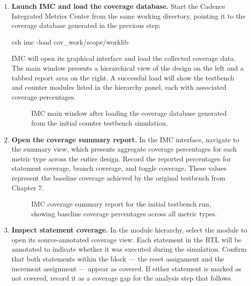 \begin{enumerate}
\item \textbf{Launch IMC and load the coverage database.} Start the Cadence Integrated Metrics Center from the same working directory, pointing it to the coverage database generated in the previous step:

\begin{codeblock}{csh}
imc -load cov_work/scope/worklib
\end{codeblock}

IMC will open its graphical interface and load the collected coverage data. The main window presents a hierarchical view of the design on the left and a tabbed report area on the right. A successful load will show the testbench and counter modules listed in the hierarchy panel, each with associated coverage percentages.

\begin{figure}[H]
\centering
\caption{IMC main window after loading the coverage database generated from the initial counter testbench simulation.}
\end{figure}

\item \textbf{Open the coverage summary report.} In the IMC interface, navigate to the summary view, which presents aggregate coverage percentages for each metric type across the entire design. Record the reported percentages for statement coverage, branch coverage, and toggle coverage. These values represent the baseline coverage achieved by the original testbench from Chapter 7.

\begin{figure}[H]
\centering
\caption{IMC coverage summary report for the initial testbench run, showing baseline coverage percentages across all metric types.}
\end{figure}

\item \textbf{Inspect statement coverage.} In the module hierarchy, select the  module to open its source-annotated coverage view. Each statement in the RTL will be annotated to indicate whether it was executed during the simulation. Confirm that both statements within the  block — the reset assignment and the increment assignment — appear as covered. If either statement is marked as not covered, record it as a coverage gap for the analysis step that follows.


\end{enumerate}

